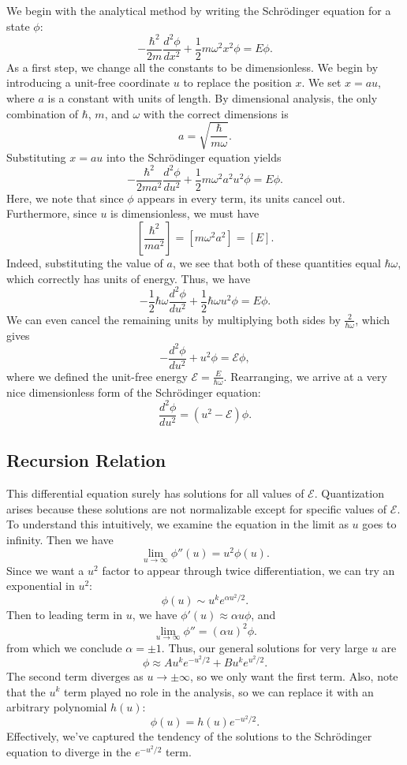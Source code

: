 We begin with the analytical method by writing the Schrödinger equation for a state $\phi$: $$-\frac{\hbar^2}{2m}\frac{d^2\phi}{dx^2}+\frac{1}{2}m\omega^2x^2\phi=E\phi.$$As a first step, we change all the constants to be dimensionless. We begin by introducing a unit-free coordinate $u$ to replace the position $x$. We set $x=au$, where $a$ is a constant with units of length. By dimensional analysis, the only combination of $\hbar$, $m$, and $\omega$ with the correct dimensions is $$a=\sqrt{\frac{\hbar}{m\omega}}.$$Substituting $x=au$ into the Schrödinger equation yields $$-\frac{\hbar^2}{2ma^2}\frac{d^2\phi}{du^2}+\frac{1}{2}m\omega^2a^2u^2\phi=E\phi.$$Here, we note that since $\phi$ appears in every term, its units cancel out. Furthermore, since $u$ is dimensionless, we must have $$[\frac{\hbar^2}{ma^2}]=[m\omega^2a^2]=[E].$$Indeed, substituting the value of $a$, we see that both of these quantities equal $\hbar\omega$, which correctly has units of energy. Thus, we have $$-\frac{1}{2}\hbar\omega\frac{d^2\phi}{du^2}+\frac{1}{2}\hbar\omega u^2\phi=E\phi.$$We can even cancel the remaining units by multiplying both sides by $\frac{2}{\hbar\omega}$, which gives $$-\frac{d^2\phi}{du^2}+u^2\phi=\mathcal{E}\phi,$$where we defined the unit-free energy $\mathcal{E}=\frac{E}{\hbar\omega}$. Rearranging, we arrive at a very nice dimensionless form of the Schrödinger equation: $$\boxed{\frac{d^2\phi}{du^2}=(u^2-\mathcal{E})\phi}.$$

\subsection{Recursion Relation}\label{recursion_relation_harmonic_oscillator}

This differential equation surely has solutions for all values of $\mathcal{E}$. Quantization arises because these solutions are not normalizable except for specific values of $\mathcal{E}$. To understand this intuitively, we examine the equation in the limit as $u$ goes to infinity. Then we have $$\lim_{u\to\infty}\phi''(u)= u^2\phi(u).$$Since we want a $u^2$ factor to appear through twice differentiation, we can try an exponential in $u^2$: $$\phi(u)\sim u^ke^{\alpha u^2/2}.$$Then to leading term in $u$, we have $\phi'(u)\approx\alpha u\phi$, and $$\lim_{u\to\infty}\phi''=(\alpha u)^2\phi.$$from which we conclude $\alpha=\pm 1$. Thus, our general solutions for very large $u$ are $$\phi\approx Au^ke^{-u^2/2}+Bu^ke^{u^2/2}.$$The second term diverges as $u\rightarrow\pm\infty$, so we only want the first term. Also, note that the $u^k$ term played no role in the analysis, so we can replace it with an arbitrary polynomial $h(u)$: $$\phi(u)=h(u)e^{-u^2/2}.$$Effectively, we've captured the tendency of the solutions to the Schrödinger equation to diverge in the $e^{-u^2/2}$ term. 

